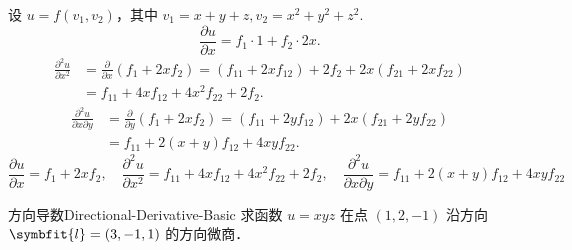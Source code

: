 \begin{solution}

    设 $u = f(v_1, v_2)$，其中 $v_1 = x+y+z, v_2 = x^2+y^2+z^2$.
    \begin{equation}
        \frac{\partial u}{\partial x} = f_1 \cdot 1 + f_2 \cdot 2x.
    \end{equation}
    \begin{equation}
        \begin{aligned}
            \frac{\partial^2 u}{\partial x^2} & = \frac{\partial}{\partial x} (f_1 + 2x f_2) = (f_{11} + 2x f_{12}) + 2 f_2 + 2x (f_{21} + 2x f_{22}) \\
                                              & = f_{11} + 4x f_{12} + 4x^2 f_{22} + 2f_2.
        \end{aligned}
    \end{equation}
    \begin{equation}
        \begin{aligned}
            \frac{\partial^2 u}{\partial x \partial y} & = \frac{\partial}{\partial y} (f_1 + 2x f_2) = (f_{11} + 2y f_{12}) + 2x (f_{21} + 2y f_{22}) \\
                                                       & = f_{11} + 2(x+y) f_{12} + 4xy f_{22}.
        \end{aligned}
    \end{equation}
    \begin{equation}
        \boxed{\frac{\partial u}{\partial x} = f_1 + 2x f_2, \quad \frac{\partial^2 u}{\partial x^2} = f_{11} + 4x f_{12} + 4x^2 f_{22} + 2f_2, \quad \frac{\partial^2 u}{\partial x \partial y} = f_{11} + 2(x+y) f_{12} + 4xy f_{22}}
    \end{equation}
\end{solution}


\begin{problem}{方向导数}{Directional-Derivative-Basic}
    求函数 $u = xyz$ 在点 $(1, 2, -1)$ 沿方向 $\symbfit{l} = (3, -1, 1)$ 的方向微商．
\end{problem}

